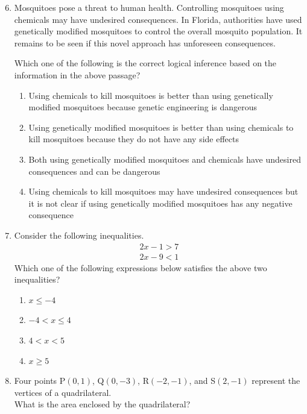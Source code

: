 \documentclass[12pt,a4paper]{article}
\begin{document}
\begin{enumerate}
   \setcounter{enumi}{5}
   \item Mosquitoes pose a threat to human health. Controlling mosquitoes using chemicals may have undesired consequences. In Florida, authorities have used genetically modified mosquitoes to control the overall mosquito population. It remains to be seen if this novel approach has unforeseen consequences.

         Which one of the following is the correct logical inference based on the information in the above passage?
         \begin{enumerate}
            \item Using chemicals to kill mosquitoes is better than using genetically modified mosquitoes because genetic engineering is dangerous
            \item Using genetically modified mosquitoes is better than using chemicals to kill mosquitoes because they do not have any side effects
            \item Both using genetically modified mosquitoes and chemicals have undesired consequences and can be dangerous
            \item Using chemicals to kill mosquitoes may have undesired consequences but it is not clear if using genetically modified mosquitoes has any negative consequence
         \end{enumerate}

   \item Consider the following inequalities.
         \begin{align}
            2x - 1 > 7 \\
            2x - 9 < 1
         \end{align}
         Which one of the following expressions below satisfies the above two inequalities?
         \begin{enumerate}
            \item $x \leq -4$
            \item $-4 < x \leq 4$
            \item $4 < x < 5$
            \item $x \geq 5$
         \end{enumerate}

   \item Four points P$(0, 1)$, Q$(0, -3)$, R$(-2, -1)$, and S$(2, -1)$ represent the vertices of a quadrilateral.\\
         What is the area enclosed by the quadrilateral?
         \begin{enumerate}
         \end{enumerate}


\end{enumerate}
\end{document}
